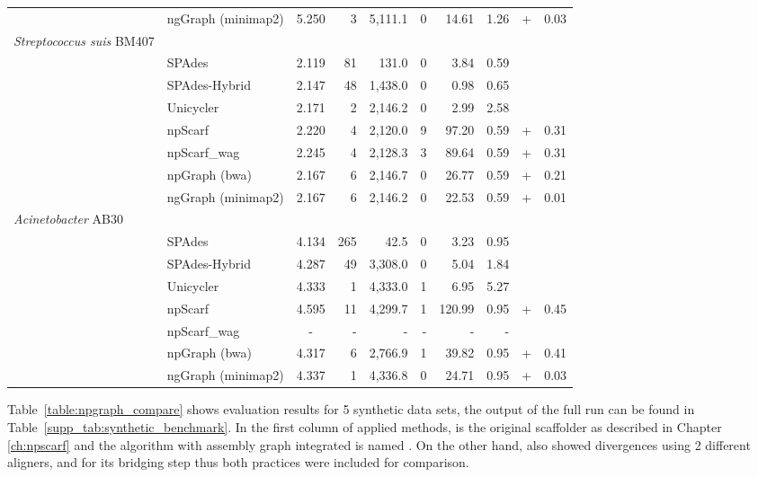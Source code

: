 \begin{longtable}{llcrrrrr@{\hspace{2pt}}c@{\hspace{2pt}}r}
 & ngGraph (minimap2)  & 5.250 & 3  & 5,111.1  & 0  & 14.61  &  1.26 & + & 0.03 \\
\rowcolor{Gray} \multicolumn{10}{l}
{\emph{Streptococcus suis} BM407} \\*  
 & SPAdes  & 2.119 &  81 &  131.0 & 0  & 3.84  & 0.59  &  &  \\*
 & SPAdes-Hybrid  & 2.147 & 48  &  1,438.0 &  0 &  0.98 & 0.65  &  &  \\*
 & Unicycler  & 2.171 &  2 &  2,146.2 & 0  &  2.99 &  2.58  &  &  \\*
 & npScarf  & 2.220 &  4 &  2,120.0  & 9  & 97.20  & 0.59 & + & 0.31 \\*
 & npScarf\_wag  & 2.245 & 4  &  2,128.3  & 3  &  89.64 & 0.59 & + &  0.31\\*
 & npGraph (bwa)  & 2.167 & 6  & 2,146.7  &  0 &  26.77 & 0.59  & + &  0.21\\*
 & ngGraph (minimap2)  & 2.167 & 6  &  2,146.2 &  0 & 22.53  &  0.59 & + & 0.01 \\
\rowcolor{Gray} \multicolumn{10}{l}
{\emph{Acinetobacter} AB30} \\*  
 & SPAdes  & 4.134 & 265  & 42.5  &  0 &  3.23 & 0.95  &  &  \\*
 & SPAdes-Hybrid  & 4.287 & 49  &  3,308.0 &  0 & 5.04  & 1.84  &  &  \\*
 & Unicycler  & 4.333 & 1  &  4,333.0 &  1 & 6.95  &  5.27 &  &  \\*
 & npScarf  & 4.595 & 11  & 4,299.7  & 1  & 120.99  & 0.95  & + & 0.45 \\*
 & npScarf\_wag  & - & -  &  - & -  &  - &  - &  &  \\*
 & npGraph (bwa)  & 4.317 & 6  &  2,766.9 & 1  &  39.82 &  0.95 & + & 0.41 \\*
 & ngGraph (minimap2)  & 4.337 & 1  &  4,336.8 & 0  & 24.71  & 0.95  & + & 0.03 \\
\end{longtable}

\normalsize

Table~\ref{table:npgraph_compare} shows evaluation results for 5 synthetic data sets, the output of the full run can be found in Table~\ref{supp_tab:synthetic_benchmark}.
In the first column of applied methods, \npscarf{} is the original scaffolder as described in Chapter \ref{ch:npscarf} and the algorithm with assembly graph integrated is named \npscarfg{}.
On the other hand, \npgraph{} also showed divergences using 2 different aligners, \bwa{} and \minimap{} for its bridging step thus both practices were included for comparison.

